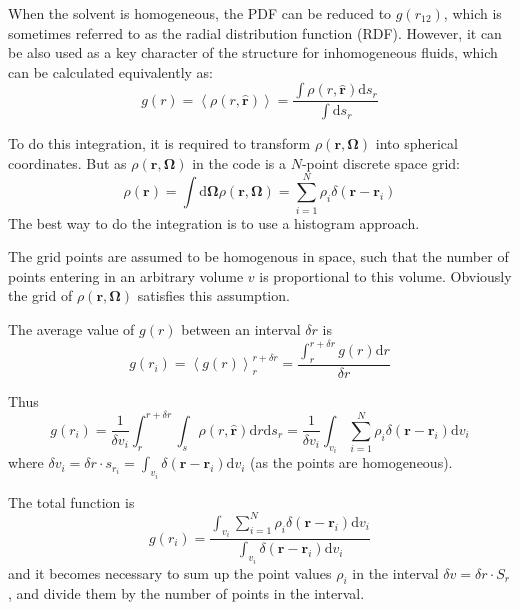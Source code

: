When the solvent is homogeneous, the \acs{PDF} can be reduced to
$g(r_{12})$, which is sometimes referred to as the radial distribution
function (\acs{RDF}). However, it can be also used as a key character
of the structure for inhomogeneous fluids, which can be calculated
equivalently as:
\begin{equation}
g(r)=\left\langle \rho(r,\hat{\mathbf{r}})\right\rangle =\dfrac{\int\rho(r,\hat{\mathbf{r}})\mathrm{d}s_{r}}{\int\mathrm{d}s_{r}}
\end{equation}

To do this integration, it is required to transform $\rho(\mathbf{r},\mathbf{\Omega})$
into spherical coordinates. But as $\rho(\mathbf{r},\mathbf{\Omega})$
in the code is a $N$-point discrete space grid:
\begin{equation}
\rho(\mathbf{r})=\int\mathrm{d}\mathbf{\Omega}\rho(\mathbf{r},\mathbf{\Omega})=\sum_{i=1}^{N}\rho_{i}\delta(\mathbf{r}-\mathbf{r}_{i})
\end{equation}
The best way to do the integration is to use a histogram approach.

The grid points are assumed to be homogenous in space, such that the
number of points entering in an arbitrary volume $v$ is proportional
to this volume. Obviously the grid of $\rho(\mathbf{r},\mathbf{\Omega})$
satisfies this assumption.

The average value of $g(r)$ between an interval $\delta r$ is
\begin{equation}
g(r_{i})=\left\langle g(r)\right\rangle _{r}^{r+\delta r}=\dfrac{\int_{r}^{r+\delta r}g(r)\mathrm{d}r}{\delta r}
\end{equation}

Thus
\begin{equation}
g(r_{i})=\dfrac{1}{\delta v_{i}}\int_{r}^{r+\delta r}\int_{s}\rho(r,\hat{\mathbf{r}})\mathrm{d}r\mathrm{d}s_{r}=\dfrac{1}{\delta v_{i}}\int_{v_{i}}\sum_{i=1}^{N}\rho_{i}\delta(\mathbf{r}-\mathbf{r}_{i})\mathrm{d}v_{i}
\end{equation}
where $\delta v_{i}=\delta r\cdot s_{r_{i}}=\int_{v_{i}}\delta(\mathbf{r}-\mathbf{r}_{i})\mathrm{d}v_{i}$
(as the points are homogeneous). 

The total function is 
\begin{equation}
g(r_{i})=\dfrac{\int_{v_{i}}\sum_{i=1}^{N}\rho_{i}\delta(\mathbf{r}-\mathbf{r}_{i})\mathrm{d}v_{i}}{\int_{v_{i}}\delta(\mathbf{r}-\mathbf{r}_{i})\mathrm{d}v_{i}}
\end{equation}
and it becomes necessary to sum up the point values $\rho_{i}$ in
the interval $\delta v=\delta r\cdot S_{r}$, and divide them by the
number of points in the interval.


